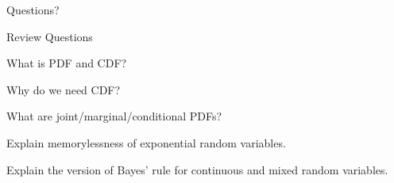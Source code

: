 \begin{frame}{}
\vspace{2cm}
\LARGE Questions?

\end{frame}

\begin{frame}{Review Questions}

\bce[1)]
\item What is PDF  and CDF?

\item Why do we need CDF?

\item What are joint/marginal/conditional PDFs?

\item Explain memorylessness of exponential random variables.

\item Explain the version of Bayes' rule for continuous and mixed random variables.

\ece

\end{frame}


